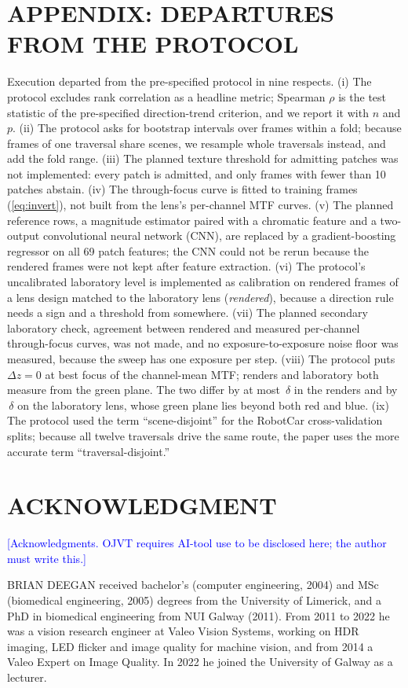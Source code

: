 \documentclass{ieee-ojvt}
\newcommand{\note}[1]{\textcolor{blue}{[#1]}}
\begin{document}
\section*{APPENDIX: DEPARTURES FROM THE PROTOCOL}
Execution departed from the pre-specified protocol in nine respects. (i) The protocol excludes rank correlation as a headline metric; Spearman $\rho$ is the test statistic of the pre-specified direction-trend criterion, and we report it with $n$ and $p$. (ii) The protocol asks for bootstrap intervals over frames within a fold; because frames of one traversal share scenes, we resample whole traversals instead, and add the fold range. (iii) The planned texture threshold for admitting patches was not implemented: every patch is admitted, and only frames with fewer than 10 patches abstain. (iv) The through-focus curve is fitted to training frames (\eqref{eq:invert}), not built from the lens's per-channel MTF curves. (v) The planned reference rows, a magnitude estimator paired with a chromatic feature and a two-output convolutional neural network (CNN), are replaced by a gradient-boosting regressor on all 69 patch features; the CNN could not be rerun because the rendered frames were not kept after feature extraction. (vi) The protocol's uncalibrated laboratory level is implemented as calibration on rendered frames of a lens design matched to the laboratory lens (\emph{rendered}), because a direction rule needs a sign and a threshold from somewhere. (vii) The planned secondary laboratory check, agreement between rendered and measured per-channel through-focus curves, was not made, and no exposure-to-exposure noise floor was measured, because the sweep has one exposure per step. (viii) The protocol puts $\Delta z=0$ at best focus of the channel-mean MTF; renders and laboratory both measure from the green plane. The two differ by at most \MthreeZeroOffsetMax\,$\delta$ in the renders and by \LabZeroOffsetDelta\,$\delta$ on the laboratory lens, whose green plane lies beyond both red and blue. (ix) The protocol used the term ``scene-disjoint'' for the RobotCar cross-validation splits; because all twelve traversals drive the same route, the paper uses the more accurate term ``traversal-disjoint.''

\section*{ACKNOWLEDGMENT}
\note{Acknowledgments. OJVT requires AI-tool use to be disclosed here; the author must write this.}




\begin{IEEEbiographynophoto}{BRIAN DEEGAN} received bachelor's (computer engineering, 2004) and MSc (biomedical engineering, 2005) degrees from the University of Limerick, and a PhD in biomedical engineering from NUI Galway (2011). From 2011 to 2022 he was a vision research engineer at Valeo Vision Systems, working on HDR imaging, LED flicker and image quality for machine vision, and from 2014 a Valeo Expert on Image Quality. In 2022 he joined the University of Galway as a lecturer.
\end{IEEEbiographynophoto}
\end{document}
